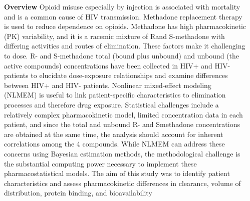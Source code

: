 \documentclass[final]{beamer}
\newlength{\sepwidth}
\newlength{\colwidth}
\newcommand{\separatorcolumn}{\begin{column}{\sepwidth}\end{column}}
\begin{document}
\begin{frame}[t]
\begin{columns}[t]
\separatorcolumn

\begin{column}{\colwidth}

  \begin{block}{\textbf{Overview}}
Opioid misuse especially by injection is associated with mortality and is
a common cause of HIV transmission. Methadone replacement
therapy is used to reduce dependence on opioids. Methadone has
high pharmacokinetic (PK) variability, and it is a racemic mixture of Rand
S-methadone with differing activities and routes of elimination.
These factors make it challenging to dose. R- and S-methadone total
(bound plus unbound) and unbound (the active compounds)
concentrations have been collected in HIV+ and HIV- patients to
elucidate dose-exposure relationships and examine differences
between HIV+ and HIV- patients. Nonlinear mixed-effect modeling
(NLMEM) is useful to link patient-specific characteristics to elimination
processes and therefore drug exposure. Statistical challenges include
a relatively complex pharmacokinetic model, limited concentration data
in each patient, and since the total and unbound R- and Smethadone
concentrations are obtained at the same time, the analysis
should account for inherent correlations among the 4 compounds.
While NLMEM can address these concerns using Bayesian estimation
methods, the methodological challenge is the substantial computing
power necessary to implement these pharmacostatistical models. The
aim of this study was to identify patient characteristics and assess
pharmacokinetic differences in clearance, volume of distribution,
protein binding, and bioavailability


\end{block}
\end{column}
\end{columns}
\end{frame}
\end{document}
